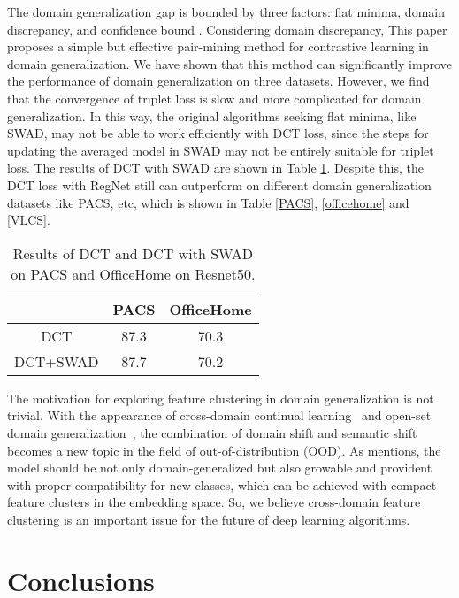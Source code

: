 \documentclass[a4paper,fleqn]{cas-dc}
\begin{document}
\label{sec:discussion}
The domain generalization gap is bounded by three factors: flat minima, domain discrepancy, and confidence bound \cite{swad}. Considering domain discrepancy, This paper proposes a simple but effective pair-mining method for contrastive learning in domain generalization. We have shown that this method can significantly improve the performance of domain generalization on three datasets. However, we find that the convergence of triplet loss is slow and  more complicated for domain generalization. In this way, the original algorithms seeking flat minima, like SWAD, may not be able to work efficiently with DCT loss, since the steps for updating the averaged model in SWAD may not be entirely suitable for triplet loss. The results of DCT with SWAD are shown in Table \ref{tabswad}. Despite this, the DCT loss with RegNet still can outperform on different domain generalization datasets like PACS, etc, which is shown in Table \ref{PACS}, \ref{officehome} and \ref{VLCS}. \par
\begin{table}[h]
    \centering
    \caption{Results of DCT and DCT with SWAD on PACS and OfficeHome on Resnet50.}
    \label{tabswad}
    \begin{tabular}{c c c}
    \hline
         &PACS&OfficeHome\\
         \hline
    DCT&87.3&70.3\\
    DCT+SWAD&87.7&70.2 \\
    \hline
    \end{tabular}

\end{table}
The motivation for exploring feature clustering in domain generalization is not trivial. With the appearance of cross-domain continual learning~\cite{MSL} and open-set domain generalization~\cite{opensetdg}, the combination of domain shift and semantic shift becomes a new topic in the field of out-of-distribution (OOD). As \cite{forward} mentions, the model should be not only domain-generalized but also growable and provident with proper compatibility for new classes, which can be achieved with compact feature clusters in the embedding space. So, we believe  cross-domain feature clustering is an important issue for the future of deep learning algorithms.  \section{Conclusions}
\label{sec:concl}
\end{document}

